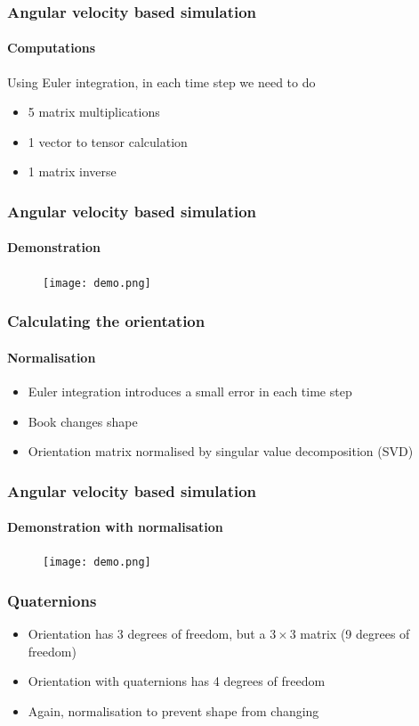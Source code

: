 \documentclass{beamer}
\begin{document}
\begin{frame}
 \frametitle{Angular velocity based simulation}
 \framesubtitle{Computations}
 Using Euler integration, in each time step we need to do
 \begin{itemize}
  \item 5 matrix multiplications
  \item 1 vector to tensor calculation
  \item 1 matrix inverse
 \end{itemize}
\end{frame}

\begin{frame}
 \frametitle{Angular velocity based simulation}
 \framesubtitle{Demonstration}
 \begin{figure}
  \centering
  \texttt{[image: demo.png]}
 \end{figure}
\end{frame}

\begin{frame}
 \frametitle{Calculating the orientation} 
 \framesubtitle{Normalisation}
 \begin{itemize}
  \item Euler integration introduces a small error in each time step
  \item Book changes shape
  \item Orientation matrix normalised by singular value decomposition (SVD)
 \end{itemize}
\end{frame}

\begin{frame}
 \frametitle{Angular velocity based simulation}
 \framesubtitle{Demonstration with normalisation}
 \begin{figure}
  \centering
  \texttt{[image: demo.png]}
 \end{figure}
\end{frame}

\begin{frame}
 \frametitle{Quaternions} 
 \begin{itemize}
  \item Orientation has 3 degrees of freedom, but a $3 \times 3$ matrix (9 degrees of freedom)
  \item Orientation with quaternions has 4 degrees of freedom
  \item Again, normalisation to prevent shape from changing
 \end{itemize}
\end{frame}
\end{document}
